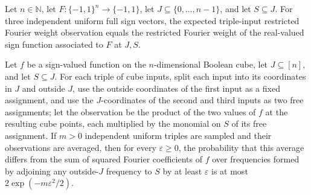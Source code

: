 \begin{theorem}
\label{FABL.expect_restrictedFourierWeightTripleObservation}
\leanok
{}
Let $n\in\mathbb N$, let $F:\{−1,1\}^n\to\{−1,1\}$, let $J\subseteq\{0,\ldots,n-1\}$,
and let $S\subseteq J$. For three independent uniform full sign vectors, the expected
triple-input restricted Fourier weight observation equals the restricted Fourier weight
of the real-valued sign function associated to $F$ at $J,S$.
\end{theorem}

\begin{theorem}
\label{FABL.measure_restrictedFourierWeightTripleEmpiricalMean_failure_le}
\leanok
{}
Let $f$ be a sign-valued function on the $n$-dimensional Boolean cube, let
$J\subseteq[n]$, and let $S\subseteq J$. For each triple of cube inputs, split each
input into its coordinates in $J$ and outside $J$, use the outside coordinates of the
first input as a fixed assignment, and use the $J$-coordinates of the second and third
inputs as two free assignments; let the observation be the product of the two values of
$f$ at the resulting cube points, each multiplied by the monomial on $S$ of its free
assignment. If $m>0$ independent uniform triples are sampled and their observations are
averaged, then for every $\varepsilon\ge 0$, the probability that this average differs
from the sum of squared Fourier coefficients of $f$ over frequencies formed by adjoining
any outside-$J$ frequency to $S$ by at least $\varepsilon$ is at most
$2\exp(-m\varepsilon^2/2)$.
\end{theorem}
